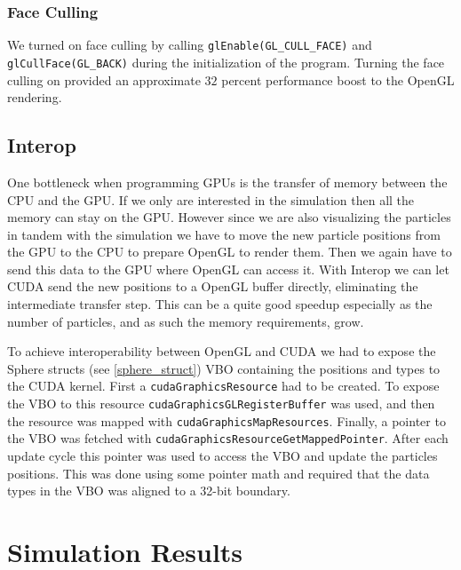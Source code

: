\documentclass[a4paper]{article}
\begin{document}
\subsubsection{Face Culling}

We turned on face culling by calling \verb|glEnable(GL_CULL_FACE)| and \verb|glCullFace(GL_BACK)| during the initialization of the program. 
Turning the face culling on provided an approximate $32$ percent performance boost to the OpenGL rendering. 

  

\subsection{Interop}

One bottleneck when programming GPUs is the transfer of memory between the CPU and the GPU. 
If we only are interested in the simulation then all the memory can stay on the GPU. 
However since we are also visualizing the particles in tandem with the simulation we have to move the new particle positions from the GPU to the CPU to prepare OpenGL to render them. 
Then we again have to send this data to the GPU where OpenGL can access it. 
With Interop we can let CUDA send the new positions to a OpenGL buffer directly, eliminating the intermediate transfer step. 
This can be a quite good speedup especially as the number of particles, and as such the memory requirements, grow. 

To achieve interoperability between OpenGL and CUDA we had to expose the Sphere structs (see \ref{sphere_struct}) VBO containing the positions and types to the CUDA kernel. 
First a \verb|cudaGraphicsResource| had to be created. 
To expose the VBO to this resource \verb|cudaGraphicsGLRegisterBuffer| was used, and then the resource was mapped with \verb|cudaGraphicsMapResources|. 
Finally, a pointer to the VBO was fetched with \verb|cudaGraphicsResourceGetMappedPointer|. 
After each update cycle this pointer was used to access the VBO and update the particles positions. 
This was done using some pointer math and required that the data types in the VBO was aligned to a 32-bit boundary. 

\section{Simulation Results}
\end{document}
